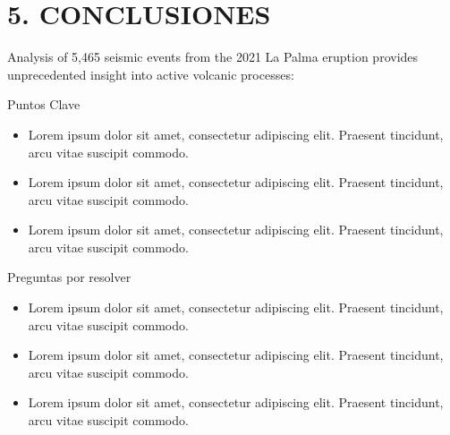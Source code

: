 \documentclass[
  spanish,
  letterpaper,
]{book}
\providecommand{\tightlist}{%
  \setlength{\itemsep}{0pt}\setlength{\parskip}{0pt}}
\begin{document}

\chapter{5. CONCLUSIONES}\label{conclusiones}

Analysis of 5,465 seismic events from the 2021 La Palma eruption
provides unprecedented insight into active volcanic processes:

\begin{tcolorbox}[enhanced jigsaw, rightrule=.15mm, colframe=quarto-callout-important-color-frame, opacityback=0, arc=.35mm, bottomrule=.15mm, toprule=.15mm, breakable, colback=white, leftrule=.75mm, left=2mm]

Puntos Clave

\begin{itemize}
\tightlist
\item
  Lorem ipsum dolor sit amet, consectetur adipiscing elit. Praesent
  tincidunt, arcu vitae suscipit commodo.
\item
  Lorem ipsum dolor sit amet, consectetur adipiscing elit. Praesent
  tincidunt, arcu vitae suscipit commodo.
\item
  Lorem ipsum dolor sit amet, consectetur adipiscing elit. Praesent
  tincidunt, arcu vitae suscipit commodo.
\end{itemize}

\end{tcolorbox}

\begin{tcolorbox}[enhanced jigsaw, rightrule=.15mm, colframe=quarto-callout-important-color-frame, opacityback=0, arc=.35mm, bottomrule=.15mm, toprule=.15mm, breakable, colback=white, leftrule=.75mm, left=2mm]

Preguntas por resolver

\begin{itemize}
\tightlist
\item
  Lorem ipsum dolor sit amet, consectetur adipiscing elit. Praesent
  tincidunt, arcu vitae suscipit commodo.
\item
  Lorem ipsum dolor sit amet, consectetur adipiscing elit. Praesent
  tincidunt, arcu vitae suscipit commodo.
\item
  Lorem ipsum dolor sit amet, consectetur adipiscing elit. Praesent
  tincidunt, arcu vitae suscipit commodo.
\end{itemize}

\end{tcolorbox}
\end{document}
